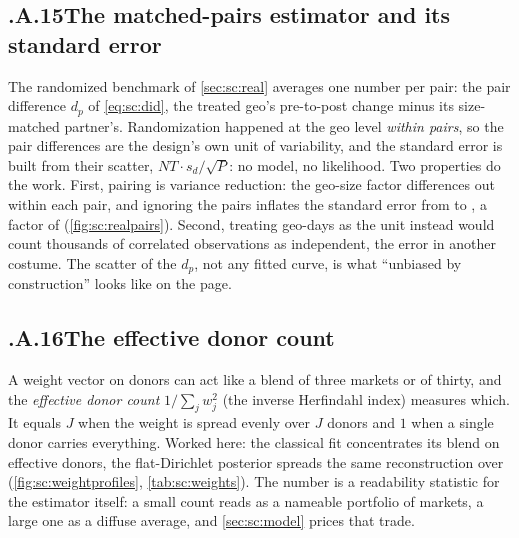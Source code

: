 \subsection*{\thechapter.A.15\quad The matched-pairs estimator and its standard error}
\label{app:sc:pairs}
The randomized benchmark of \cref{sec:sc:real} averages one number per pair: the pair difference
$d_p$ of \cref{eq:sc:did}, the treated geo's pre-to-post change minus its size-matched partner's.
Randomization happened at the geo level \emph{within pairs}, so the pair differences are the
design's own unit of variability, and the standard error is built from their scatter,
$NT \cdot s_d / \sqrt{P}$: no model, no likelihood. Two properties do the work. First, pairing is
variance reduction: the geo-size factor differences out within each pair, and ignoring the pairs
inflates the standard error from \kusd{\nbSevenBDidSe} to \kusd{\nbSevenBUnpairedSe}, a factor of
\nbSevenBPairingGain{} (\cref{fig:sc:realpairs}). Second, treating geo-days as the unit instead
would count thousands of correlated observations as independent, the \citet{bertrand2004} error in
another costume. The scatter of the $d_p$, not any fitted curve, is what ``unbiased by
construction'' looks like on the page.

\subsection*{\thechapter.A.16\quad The effective donor count}
\label{app:sc:effdonors}
A weight vector on \nbSevenNDonors{} donors can act like a blend of three markets or of thirty, and
the \emph{effective donor count} $1/\sum_j w_j^{2}$ (the inverse Herfindahl index) measures which.
It equals $J$ when the weight is spread evenly over $J$ donors and $1$ when a single donor carries
everything. Worked here: the classical fit concentrates its blend on \nbSevenClEffDonors{}
effective donors, the flat-Dirichlet posterior spreads the same reconstruction over
\nbSevenBayesEffDonors{} (\cref{fig:sc:weightprofiles}, \cref{tab:sc:weights}). The number is a
readability statistic for the estimator itself: a small count reads as a nameable portfolio of
markets, a large one as a diffuse average, and \cref{sec:sc:model} prices that trade.

